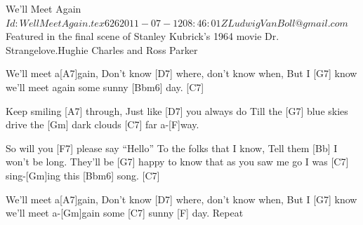 \begin{SBSong}{We'll Meet Again}
    {$Id: WellMeetAgain.tex 626 2011-07-12 08:46:01Z LudwigVanBoll@gmail.com $}
    {Featured in the final scene of Stanley Kubrick's 1964 movie Dr. Strangelove.}{Hughie Charles and Ross Parker}
  \begin{SBVerse}
    [F] We'll meet a[A7]gain,
    Don't know [D7] where, don't know when,
    But I [G7] know we'll meet again some sunny [Bbm6] day. [C7]
  \end{SBVerse}
  \begin{SBVerse}
    [F] Keep smiling [A7] through,
    Just like [D7] you always do
    Till the [G7] blue skies drive the [Gm] dark clouds [C7] far a-[F]way.
  \end{SBVerse}
  \begin{SBVerse}
    So will you [F7] please say ``Hello''
    To the folks that I know,
    Tell them [Bb] I won't be long.
    They'll be [G7] happy to know that as you saw me go
    I was [C7] sing-[Gm]ing this [Bbm6] song. [C7]
  \end{SBVerse}
  \begin{SBVerse}
    [F] We'll meet a[A7]gain,
    Don't know [D7] where, don't know when,
    But I [G7] know we'll meet a-[Gm]gain some [C7] sunny [F] day.
    Repeat
  \end{SBVerse}
\end{SBSong}
